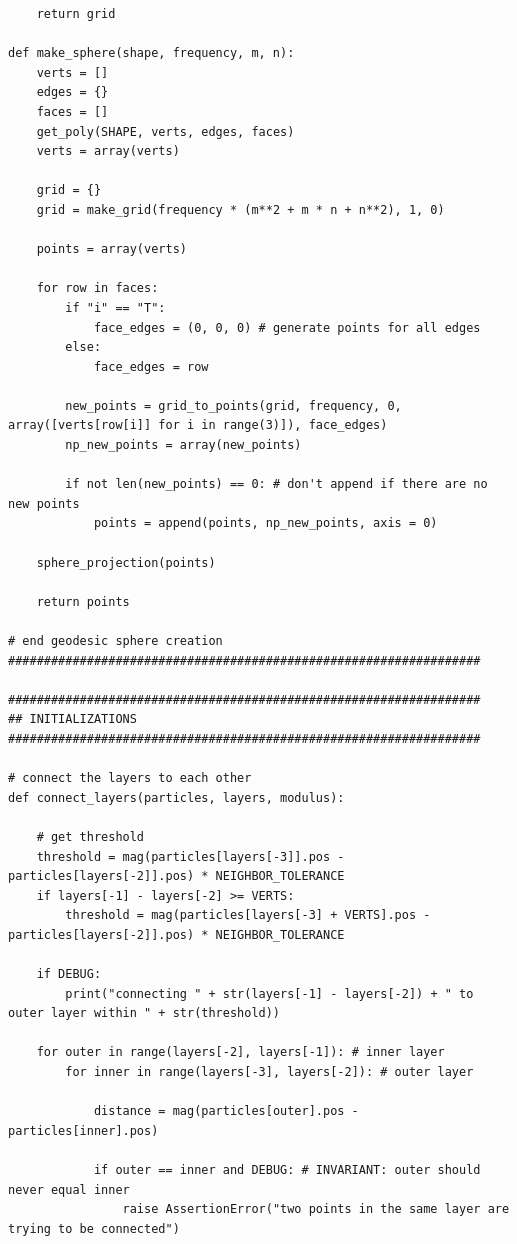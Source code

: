 \documentclass{article}
\begin{document}
\begin{verbatim}
    return grid

def make_sphere(shape, frequency, m, n):
    verts = []
    edges = {}
    faces = []
    get_poly(SHAPE, verts, edges, faces)
    verts = array(verts)

    grid = {}
    grid = make_grid(frequency * (m**2 + m * n + n**2), 1, 0)

    points = array(verts)

    for row in faces:
        if "i" == "T":
            face_edges = (0, 0, 0) # generate points for all edges
        else:
            face_edges = row

        new_points = grid_to_points(grid, frequency, 0, array([verts[row[i]] for i in range(3)]), face_edges)
        np_new_points = array(new_points)

        if not len(new_points) == 0: # don't append if there are no new points
            points = append(points, np_new_points, axis = 0)

    sphere_projection(points)

    return points

# end geodesic sphere creation
##################################################################

##################################################################
## INITIALIZATIONS
##################################################################

# connect the layers to each other
def connect_layers(particles, layers, modulus):

    # get threshold
    threshold = mag(particles[layers[-3]].pos - particles[layers[-2]].pos) * NEIGHBOR_TOLERANCE
    if layers[-1] - layers[-2] >= VERTS:
        threshold = mag(particles[layers[-3] + VERTS].pos - particles[layers[-2]].pos) * NEIGHBOR_TOLERANCE

    if DEBUG:
        print("connecting " + str(layers[-1] - layers[-2]) + " to outer layer within " + str(threshold))
        
    for outer in range(layers[-2], layers[-1]): # inner layer
        for inner in range(layers[-3], layers[-2]): # outer layer
            
            distance = mag(particles[outer].pos - particles[inner].pos)
            
            if outer == inner and DEBUG: # INVARIANT: outer should never equal inner
                raise AssertionError("two points in the same layer are trying to be connected")
            

\end{verbatim}
\end{document}
